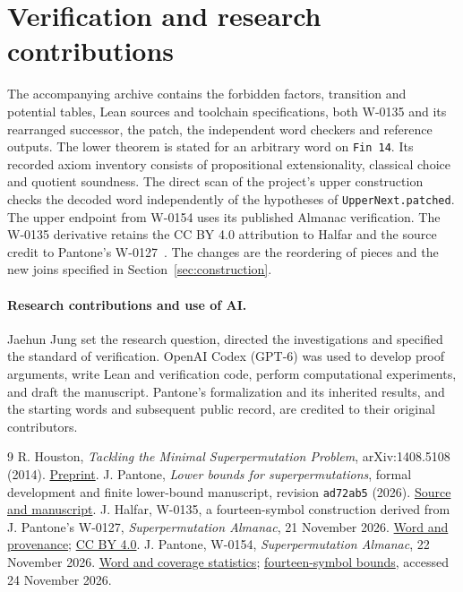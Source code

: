 \documentclass[11pt]{article}
\begin{document}
\section{Verification and research contributions}
The accompanying archive contains the forbidden factors, transition and potential tables, Lean sources and toolchain specifications, both W-0135 and its rearranged successor, the patch, the independent word checkers and reference outputs. The lower theorem is stated for an arbitrary word on \texttt{Fin 14}. Its recorded axiom inventory consists of propositional extensionality, classical choice and quotient soundness. The direct scan of the project's upper construction checks the decoded word independently of the hypotheses of \texttt{UpperNext.patched}. The upper endpoint from W-0154 uses its published Almanac verification. The W-0135 derivative retains the CC BY 4.0 attribution to Halfar and the source credit to Pantone's W-0127~\cite{almanac}. The changes are the reordering of pieces and the new joins specified in Section~\ref{sec:construction}.

\paragraph{Research contributions and use of AI.}
Jaehun Jung set the research question, directed the investigations and specified the standard of verification. OpenAI Codex (GPT-6) was used to develop proof arguments, write Lean and verification code, perform computational experiments, and draft the manuscript. Pantone's formalization and its inherited results, and the starting words and subsequent public record, are credited to their original contributors.

\begin{thebibliography}{9}
 R. Houston, \emph{Tackling the Minimal Superpermutation Problem}, arXiv:1408.5108 (2014). \href{https://arxiv.org/abs/1408.5108}{Preprint}.
 J. Pantone, \emph{Lower bounds for superpermutations}, formal development and finite lower-bound manuscript, revision \texttt{ad72ab5} (2026). \href{https://github.com/jaypantone/2026-10-superpermutation-lower-palomar/tree/ad72ab5010e945b5c8768a918281778c834dcc40}{Source and manuscript}.
 J. Halfar, W-0135, a fourteen-symbol construction derived from J. Pantone's W-0127, \emph{Superpermutation Almanac}, 21 November 2026. \href{https://superpermutations.com/w/W-0135}{Word and provenance}; \href{https://creativecommons.org/licenses/by/4.0/}{CC BY 4.0}.
 J. Pantone, W-0154, \emph{Superpermutation Almanac}, 22 November 2026. \href{https://superpermutations.com/w/W-0154}{Word and coverage statistics}; \href{https://superpermutations.com/n/14}{fourteen-symbol bounds}, accessed 24 November 2026.
\end{thebibliography}
\end{document}
